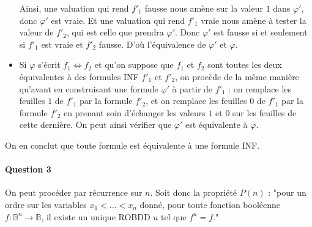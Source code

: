 \documentclass[a4paper,11pt]{article}
\begin{document}
\begin{itemize}
		Ainsi, une valuation qui rend ${f'}_1$ fausse nous amène sur la valeur $1$ dans $\varphi'$, donc $\varphi'$ est vraie. Et une valuation qui rend ${f'}_1$ vraie nous amène à tester la valeur de ${f'}_2$, qui est celle que prendra $\varphi'$. Donc $\varphi'$ est fausse si et seulement si ${f'}_1$ est vraie et ${f'}_2$ fausse. D'où l'équivalence de $\varphi'$ et $\varphi$.
		\item Si $\varphi$ s'écrit $f_1 \Leftrightarrow f_2$ et qu'on suppose que $f_1$ et $f_2$ sont toutes les deux équivalentes à des formules INF ${f'}_1$ et ${f'}_2$, on procède de la même manière qu'avant en construisant une formule $\varphi'$ à partir de ${f'}_1$ : on remplace les feuilles $1$ de ${f'}_1$ par la formule ${f'}_2$, et on remplace les feuilles $0$ de ${f'}_1$ par la formule ${f'}_2$ en prenant soin d'échanger les valeurs $1$ et $0$ sur les feuilles de cette dernière.
		On peut ainsi vérifier que $\varphi'$ est équivalente à $\varphi$.
 		\end{itemize}

On en conclut que toute formule est équivalente à une formule INF.
	
		\paragraph{Question 3} On peut procéder par récurrence sur $n$.
		Soit donc la propriété $P(n)$ : "pour un ordre sur les variables $x_1 < ... < x_n$ donné, pour toute fonction booléenne $f : \mathbb{B}^n \rightarrow \mathbb{B}$, il existe un unique ROBDD $u$ tel que $f^u = f$."
		
\end{document}
